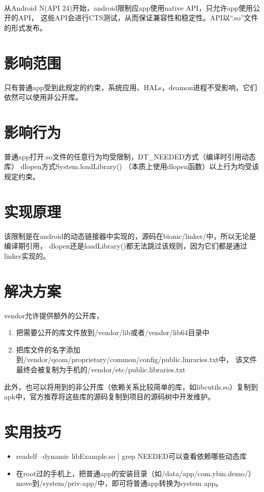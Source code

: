 \documentclass[a4paper,11pt]{article}
\begin{document}
\tt %
\pagestyle{header}
\sybmaketitle
\tableofcontents
\newpage

\pagestyle{main}
\setcounter{page}{1}

从Android N(API 24)开始，android限制应app使用native API，只允许app使用公开的API，
这些API会进行CTS测试，从而保证兼容性和稳定性。API以“.so”文件的形式发布。

\section[影响范围]{影响范围}
只有普通app受到此规定的约束，系统应用、HALs，deamon进程不受影响，它们依然可以使用非公开库。

\section[影响行为]{影响行为}
普通app打开.so文件的任意行为均受限制，DT_NEEDED方式（编译时引用动态库）
dlopen方式System.loadLibrary() （本质上使用dlopen函数）以上行为均受该规定约束。

\section[实现原理]{实现原理}
该限制是在android的动态链接器中实现的，源码在bionic/linker/中，所以无论是编译期引用，
dlopen还是loadLibrary()都无法跳过该规则，因为它们都是通过linker实现的。

\section[解决方案]{解决方案}
vendor允许提供额外的公开库，
\begin{enumerate}
  \item 把需要公开的库文件放到/vendor/lib或者/vendor/lib64目录中
  \item 把库文件的名字添加到/vendor/qcom/proprietary/common/config/public.linraries.txt中，
  该文件最终会被复制为手机的/vendor/etc/public.libraries.txt
\end{enumerate}

此外，也可以将用到的非公开库（依赖关系比较简单的库，如libcutils.so）复制到apk中，官方推荐将这些库的源码复制到项目的源码树中开发维护。

\section[实用技巧]{实用技巧}
\begin{itemize}
  \item readelf --dynamic libExample.so | grep NEEDED可以查看依赖哪些动态库
  \item 在root过的手机上，把普通app的安装目录（如/data/app/com.ybin.demo/）
  move到/system/priv-app/中，即可将普通app转换为system app。
\end{itemize}
\end{document}
